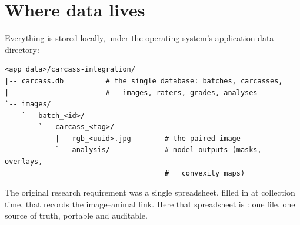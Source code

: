 \section{Where data lives}

Everything is stored locally, under the operating system's application-data
directory:

\begin{lstlisting}
<app data>/carcass-integration/
|-- carcass.db          # the single database: batches, carcasses,
|                       #   images, raters, grades, analyses
`-- images/
    `-- batch_<id>/
        `-- carcass_<tag>/
            |-- rgb_<uuid>.jpg        # the paired image
            `-- analysis/             # model outputs (masks, overlays,
                                      #   convexity maps)
\end{lstlisting}

\begin{note}[title=The single database is the "one spreadsheet"]
The original research requirement was a single spreadsheet, filled in at
collection time, that records the image--animal link. Here that spreadsheet is
: one file, one source of truth, portable and auditable.
\end{note}
